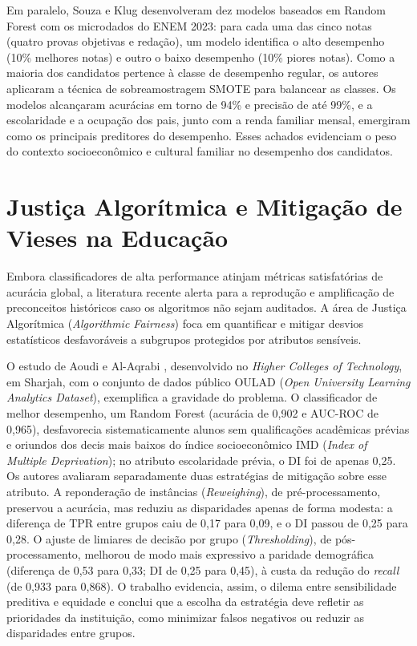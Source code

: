 Em paralelo, Souza e Klug \cite{souza2025desigualdades} desenvolveram dez modelos baseados em Random Forest com os microdados do ENEM 2023: para cada uma das cinco notas (quatro provas objetivas e redação), um modelo identifica o alto desempenho (10\% melhores notas) e outro o baixo desempenho (10\% piores notas). Como a maioria dos candidatos pertence à classe de desempenho regular, os autores aplicaram a técnica de sobreamostragem SMOTE para balancear as classes. Os modelos alcançaram acurácias em torno de 94\% e precisão de até 99\%, e a escolaridade e a ocupação dos pais, junto com a renda familiar mensal, emergiram como os principais preditores do desempenho. Esses achados evidenciam o peso do contexto socioeconômico e cultural familiar no desempenho dos candidatos.

\section{Justiça Algorítmica e Mitigação de Vieses na Educação}
\label{sec:justica_mitigacao_educacao}

Embora classificadores de alta performance atinjam métricas satisfatórias de acurácia global, a literatura recente alerta para a reprodução e amplificação de preconceitos históricos caso os algoritmos não sejam auditados. A área de Justiça Algorítmica (\textit{Algorithmic Fairness}) foca em quantificar e mitigar desvios estatísticos desfavoráveis a subgrupos protegidos por atributos sensíveis.

O estudo de Aoudi e Al-Aqrabi \cite{aoudi2025fairness}, desenvolvido no \textit{Higher Colleges of Technology}, em Sharjah, com o conjunto de dados público OULAD (\textit{Open University Learning Analytics Dataset}), exemplifica a gravidade do problema. O classificador de melhor desempenho, um Random Forest (acurácia de 0,902 e AUC-ROC de 0,965), desfavorecia sistematicamente alunos sem qualificações acadêmicas prévias e oriundos dos decis mais baixos do índice socioeconômico IMD (\textit{Index of Multiple Deprivation}); no atributo escolaridade prévia, o DI foi de apenas 0,25. Os autores avaliaram separadamente duas estratégias de mitigação sobre esse atributo. A reponderação de instâncias (\textit{Reweighing}), de pré-processamento, preservou a acurácia, mas reduziu as disparidades apenas de forma modesta: a diferença de TPR entre grupos caiu de 0,17 para 0,09, e o DI passou de 0,25 para 0,28. O ajuste de limiares de decisão por grupo (\textit{Thresholding}), de pós-processamento, melhorou de modo mais expressivo a paridade demográfica (diferença de 0,53 para 0,33; DI de 0,25 para 0,45), à custa da redução do \textit{recall} (de 0,933 para 0,868). O trabalho evidencia, assim, o dilema entre sensibilidade preditiva e equidade e conclui que a escolha da estratégia deve refletir as prioridades da instituição, como minimizar falsos negativos ou reduzir as disparidades entre grupos.

